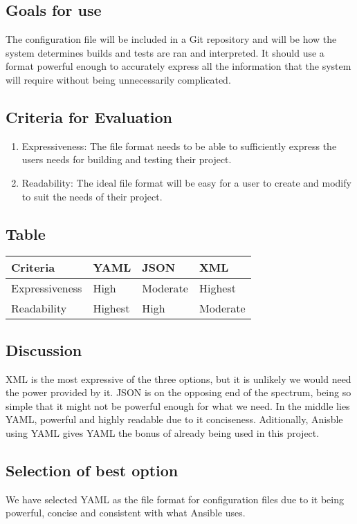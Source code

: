 \documentclass[10pt,letterpaper,onecolumn,journal]{IEEEtran}
\begin{document}
\subsection{Goals for use}
The configuration file will be included in a Git repository and will be how the system determines builds and tests are ran and interpreted. It should use a format powerful enough to accurately express all the information that the system will require without being unnecessarily complicated.
\subsection{Criteria for Evaluation}
\begin{enumerate}
  \item Expressiveness: The file format needs to be able to sufficiently express the users needs for building and testing their project.
  \item Readability: The ideal file format will be easy for a user to create and modify to suit the needs of their project.
\end{enumerate}
\subsection{Table}
\begin{center}
  \begin{tabular}{llll}
    Criteria & YAML & JSON & XML \\ \midrule
    Expressiveness       & High & Moderate & Highest \\ \midrule
    Readability       & Highest & High & Moderate \\ \bottomrule
  \end{tabular}
\end{center}
\subsection{Discussion}
XML is the most expressive of the three options, but it is unlikely we would need the power provided by it. JSON is on the opposing end of the spectrum, being so simple that it might not be powerful enough for what we need. In the middle lies YAML, powerful and highly readable due to it conciseness. Aditionally, Anisble using YAML gives YAML the bonus of already being used in this project.
\subsection{Selection of best option}
We have selected YAML as the file format for configuration files due to it being powerful, concise and consistent with what Ansible uses.
\end{document}
